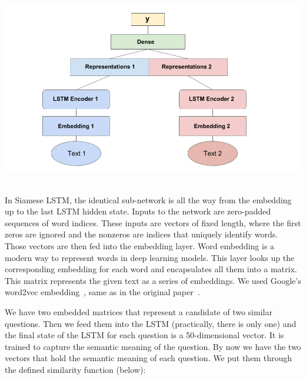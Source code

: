 \documentclass[runningheads]{llncs}
\begin{document}
	\begin{minipage}{\linewidth}
		\begin{center}
			\includegraphics[width=\linewidth]{siamese_image.png}
			\label{fig:Siamese LSTM Architectture}~\cite{ref_url22}
		\end{center}
	\end{minipage}
	\afterpage{\clearpage}
	
	In Siamese LSTM, the identical sub-network is all the way from the embedding up to the last LSTM hidden state. Inputs to the network are zero-padded sequences of word indices. These inputs are vectors of fixed length, where the first zeros are ignored and the nonzeros are indices that uniquely identify words. Those vectors are then fed into the embedding layer. Word embedding is a modern way to represent words in deep learning models. This layer looks up the corresponding embedding for each word and encapsulates all them into a matrix. This matrix represents the given text as a series of embeddings. We used Google’s word2vec embedding~\cite{ref_url23}, same as in the original paper~\cite{ref_url24}.
	
	We have two embedded matrices that represent a candidate of two similar questions. Then we feed them into the LSTM (practically, there is only one) and the final state of the LSTM for each question is a 50-dimensional vector. It is trained to capture the semantic meaning of the question. By now we have the two vectors that hold the semantic meaning of each question. We put them through the defined similarity function (below):
	
	\begin{minipage}{\linewidth}
		\begin{center}
		\end{center}
	\end{minipage}
	\afterpage{\clearpage}
	
\end{document}
